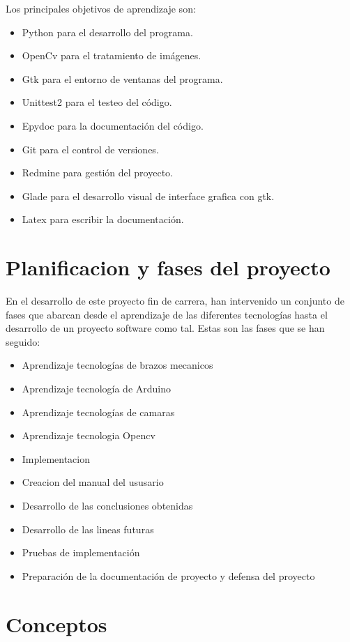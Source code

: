 \documentclass[12pt,a4paper]{report}
\begin{document}
Los principales objetivos de aprendizaje son:
\begin{itemize} 
    \item Python para el desarrollo del programa. 
    \item OpenCv para el tratamiento de imágenes. 
    \item Gtk para el entorno de ventanas del programa. 
    \item Unittest2 para el testeo del código. 
    \item Epydoc para la documentación del código. 
    \item Git para el control de versiones. 
    \item Redmine para gestión del proyecto. 
    \item Glade para el desarrollo visual de interface grafica con gtk.
    \item Latex para escribir la documentación. 
\end{itemize}


\section{Planificacion y fases del proyecto}

En el desarrollo de este proyecto fin de carrera, han intervenido un
conjunto de fases que abarcan desde el aprendizaje de las
diferentes tecnologías hasta el desarrollo de un proyecto
software como tal.
Estas son las fases que se han seguido:
\begin{itemize} 
	 \item Aprendizaje tecnologías de brazos mecanicos
	 \item Aprendizaje tecnología de Arduino
	 \item Aprendizaje tecnologías de camaras
	 \item Aprendizaje tecnologia Opencv
	 \item Implementacion
	 \item Creacion del manual del ususario
	 \item Desarrollo de las conclusiones obtenidas
	 \item Desarrollo de las lineas futuras
	 \item Pruebas de implementación
	 \item Preparación de la documentación de proyecto y defensa del proyecto
	 
\end{itemize}
\section{Conceptos}
\end{document}
